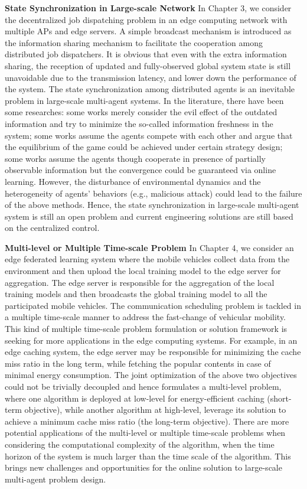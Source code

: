 \noindent\textbf{State Synchronization in Large-scale Network}
In Chapter 3, we consider the decentralized job dispatching problem in an edge computing network with multiple APs and edge servers.
A simple broadcast mechanism is introduced as the information sharing mechanism to facilitate the cooperation among distributed job dispatchers.
It is obvious that even with the extra information sharing, the reception of updated and fully-observed global system state is still unavoidable due to the transmission latency, and lower down the performance of the system.
The state synchronization among distributed agents is an inevitable problem in large-scale multi-agent systems.
In the literature, there have been some researches:
some works merely consider the evil effect of the outdated information and try to minimize the so-called information freshness in the system;
some works assume the agents compete with each other and argue that the equilibrium of the game could be achieved under certain strategy design;
some works assume the agents though cooperate in presence of partially observable information but the convergence could be guaranteed via online learning.
However, the disturbance of environmental dynamics and the heterogeneity of agents' behaviors (e.g., malicious attack) could lead to the failure of the above methods.
Hence, the state synchronization in large-scale multi-agent system is still an open problem and current engineering solutions are still based on the centralized control.

\noindent\textbf{Multi-level or Multiple Time-scale Problem}
In Chapter 4, we consider an edge federated learning system where the mobile vehicles collect data from the environment and then upload the local training model to the edge server for aggregation.
The edge server is responsible for the aggregation of the local training models and then broadcasts the global training model to all the participated mobile vehicles.
The communication scheduling problem is tackled in a multiple time-scale manner to address the fast-change of vehicular mobility.
This kind of multiple time-scale problem formulation or solution framework is seeking for more applications in the edge computing systems.
For example, in an edge caching system, the edge server may be responsible for minimizing the cache miss ratio in the long term, while fetching the popular contents in case of minimal energy consumption.
The joint optimization of the above two objectives could not be trivially decoupled and hence formulates a multi-level problem, where one algorithm is deployed at low-level for energy-efficient caching (short-term objective), while another algorithm at high-level, leverage its solution to achieve a minimum cache miss ratio (the long-term objective).
There are more potential applications of the multi-level or multiple time-scale problems when considering the computational complexity of the algorithm, when the time horizon of the system is much larger than the time scale of the algorithm.
This brings new challenges and opportunities for the online solution to large-scale multi-agent problem design.

